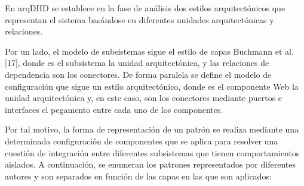 En arqDHD se establece en la fase de análisis dos estilos arquitectónicos que
representan el sistema basándose en diferentes unidades arquitectónicas y
relaciones.

Por un lado, el modelo de subsistemas sigue el estilo de capas Buchmann et al.
[17], donde es el subsistema la unidad arquitectónica, y las relaciones de
dependencia son los conectores. De forma paralela se define el modelo de
configuración que sigue un estilo arquitectónico, donde es el componente Web la
unidad arquitectónica y, en este caso, son los conectores mediante puertos e
interfaces el pegamento entre cada uno de los componentes. 


Por tal motivo, la forma de representación de un patrón se realiza mediante una
determinada configuración de componentes que se aplica para resolver una
cuestión de integración entre diferentes subsistemas que tienen comportamientos
aislados. A continuación, se enumeran los patrones representados por diferentes
autores y son separados en función de las capas en las que son aplicados:

